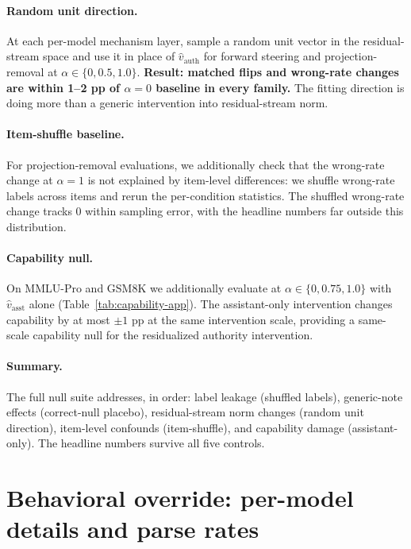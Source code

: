 \documentclass{article}
\begin{document}
\paragraph{Random unit direction.}
At each per-model mechanism layer, sample a random unit vector in the residual-stream space and use it in place of $\hat{v}_{\mathrm{auth}}$ for forward steering and projection-removal at $\alpha \in \{0, 0.5, 1.0\}$. \textbf{Result: matched flips and wrong-rate changes are within 1--2 pp of $\alpha=0$ baseline in every family.} The fitting direction is doing more than a generic intervention into residual-stream norm.

\paragraph{Item-shuffle baseline.}
For projection-removal evaluations, we additionally check that the wrong-rate change at $\alpha=1$ is not explained by item-level differences: we shuffle wrong-rate labels across items and rerun the per-condition statistics. The shuffled wrong-rate change tracks 0 within sampling error, with the headline numbers far outside this distribution.

\paragraph{Capability null.}
On MMLU-Pro and GSM8K we additionally evaluate at $\alpha \in \{0, 0.75, 1.0\}$ with $\hat{v}_{\mathrm{asst}}$ alone (Table~\ref{tab:capability-app}). The assistant-only intervention changes capability by at most $\pm 1$ pp at the same intervention scale, providing a same-scale capability null for the residualized authority intervention.

\paragraph{Summary.}
The full null suite addresses, in order: label leakage (shuffled labels), generic-note effects (correct-null placebo), residual-stream norm changes (random unit direction), item-level confounds (item-shuffle), and capability damage (assistant-only). The headline numbers survive all five controls.

\section{Behavioral override: per-model details and parse rates}
\label{app:behavioral-details}
\end{document}
